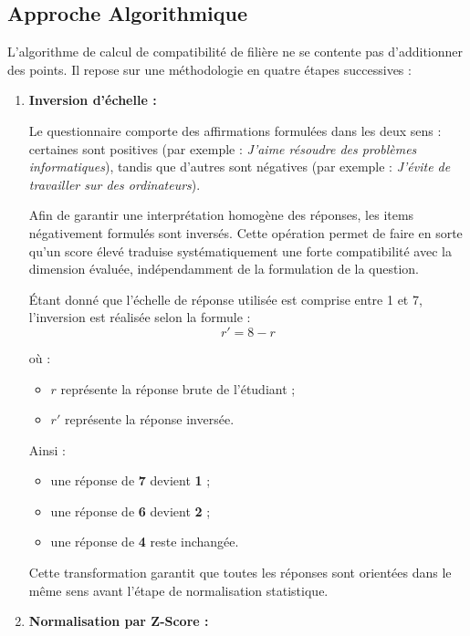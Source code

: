 \documentclass[a4paper,12pt]{article}
\begin{document}
\subsection{Approche Algorithmique}

L'algorithme de calcul de compatibilité de filière ne se contente pas d'additionner des points. Il repose sur une méthodologie en quatre étapes successives :

\begin{enumerate}

    \item \textbf{Inversion d'échelle :}

    Le questionnaire comporte des affirmations formulées dans les deux sens : certaines sont positives (par exemple : \textit{\og J'aime résoudre des problèmes informatiques\fg{}}), tandis que d'autres sont négatives (par exemple : \textit{\og J'évite de travailler sur des ordinateurs\fg{}}).

    Afin de garantir une interprétation homogène des réponses, les items négativement formulés sont inversés. Cette opération permet de faire en sorte qu'un score élevé traduise systématiquement une forte compatibilité avec la dimension évaluée, indépendamment de la formulation de la question.

    Étant donné que l'échelle de réponse utilisée est comprise entre 1 et 7, l'inversion est réalisée selon la formule :
    \[
        r' = 8 - r
    \]

    où :
    \begin{itemize}
        \item $r$ représente la réponse brute de l'étudiant ;
        \item $r'$ représente la réponse inversée.
    \end{itemize}

    Ainsi :
    \begin{itemize}
        \item une réponse de \textbf{7} devient \textbf{1} ;
        \item une réponse de \textbf{6} devient \textbf{2} ;
        \item une réponse de \textbf{4} reste inchangée.
    \end{itemize}

    Cette transformation garantit que toutes les réponses sont orientées dans le même sens avant l'étape de normalisation statistique.

    \item \textbf{Normalisation par Z-Score :}


\end{enumerate}
\end{document}
